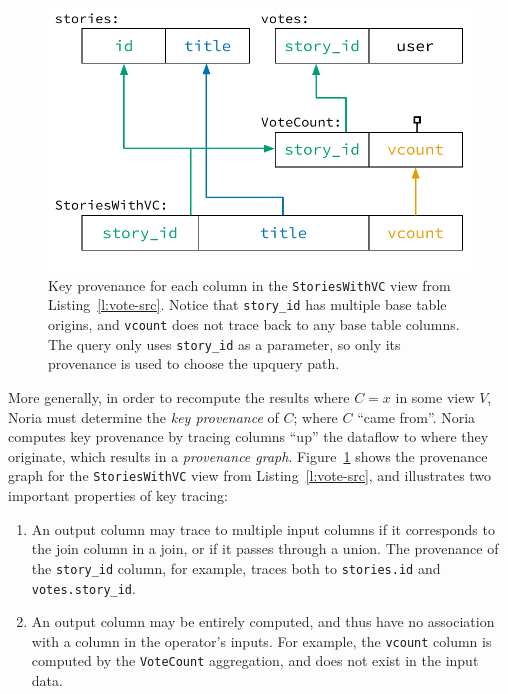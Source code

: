 \begin{figure}[t]
  \centering
  \includegraphics{diagrams/Key Provenance.pdf}
  \caption{Key provenance for each column in the \texttt{StoriesWithVC} view
  from Listing~\ref{l:vote-src}. Notice that \texttt{\color{set3}story\_id} has
  multiple base table origins, and \texttt{\color{set2}vcount} does not trace
  back to any base table columns. The query only uses
  \texttt{\color{set3}story\_id} as a parameter, so only its provenance is used
  to choose the upquery path.}
  \label{f:key-prov}
\end{figure}

More generally, in order to recompute the results where $C = x$ in some view
$V$, Noria must determine the \textit{key provenance} of $C$; where $C$ ``came
from''. Noria computes key provenance by tracing columns ``up'' the dataflow to
where they originate, which results in a \textit{provenance graph}.
Figure~\ref{f:key-prov} shows the provenance graph for the
\texttt{StoriesWithVC} view from Listing~\vref{l:vote-src}, and illustrates two
important properties of key tracing:

\begin{enumerate}
  \item An output column may trace to multiple input columns if it corresponds
    to the join column in a join, or if it passes through a union. The
    provenance of the \texttt{story\_id} column, for example, traces both to
    \texttt{stories.id} and \texttt{votes.story\_id}.
  \item An output column may be entirely computed, and thus have no association
    with a column in the operator's inputs. For example, the \texttt{vcount}
    column is computed by the \texttt{VoteCount} aggregation, and does not exist
    in the input data.
\end{enumerate}

